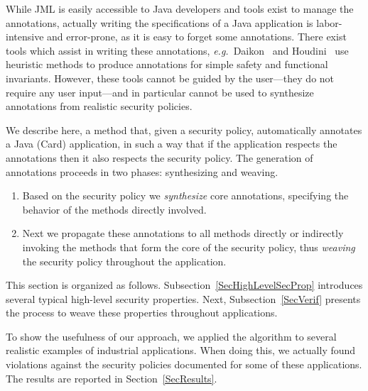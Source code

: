 
While JML is easily accessible to Java developers and tools exist
to manage the annotations, actually writing
the specifications of a Java application is labor-intensive and
error-prone, as it is easy to forget some annotations. There
exist tools which assist in writing these annotations,
\emph{e.g.}~Daikon~\cite{ErnstCGN2001:TSE} and Houdini~\cite{FlanaganL01}
use heuristic methods to produce annotations for simple safety and
functional invariants.  However, these tools cannot be guided by the
user---they do not require any user input---and in particular cannot
be used to synthesize annotations from realistic security policies.

We describe here, a method that, given a security policy,
automatically annotates a Java (Card) application, in such a way that
if the application respects the annotations then it also respects the
security policy. The generation of annotations proceeds in two phases:
synthesizing and weaving.
\begin{enumerate}
\item Based on the security policy we \emph{synthesize} core annotations, 
specifying the behavior of the methods directly involved.
\item Next we propagate these annotations to all methods directly or
indirectly invoking the methods that form the core of the security
policy, thus \emph{weaving} the security policy throughout the
application. 
\end{enumerate} 
This section is organized as follows. Subsection~\ref{SecHighLevelSecProp}
introduces several typical high-level security properties. Next,
Subsection~\ref{SecVerif} presents the process to weave these properties
throughout applications.


To show the usefulness of our approach, we applied the algorithm to
several realistic examples of industrial applications. When doing
this, we actually found violations against the security policies
documented for some of these applications.  The results are reported
in Section~\ref{SecResults}.





